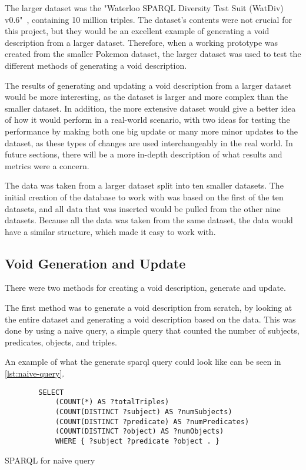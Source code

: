 The larger dataset was the "Waterloo SPARQL Diversity Test Suit (WatDiv) v0.6"~\cite{WatDiv}, containing 10 million triples. The dataset's contents were not crucial for this project, but they would be an excellent example of generating a \gls{void} description from a larger dataset. Therefore, when a working prototype was created from the smaller Pokemon dataset, the larger dataset was used to test the different methods of generating a \gls{void} description.

The results of generating and updating a \gls{void} description from a larger dataset would be more interesting, as the dataset is larger and more complex than the smaller dataset. In addition, the more extensive dataset would give a better idea of how it would perform in a real-world scenario, with two ideas for testing the performance by making both one big update or many more minor updates to the dataset, as these types of changes are used interchangeably in the real world. In future sections, there will be a more in-depth description of what results and metrics were a concern.

The data was taken from a larger dataset split into ten smaller datasets. The initial creation of the database to work with was based on the first of the ten datasets, and all data that was inserted would be pulled from the other nine datasets. Because all the data was taken from the same dataset, the data would have a similar structure, which made it easy to work with.

\subsection{Void Generation and Update}\label{sec:void}
There were two methods for creating a \gls{void} description, generate and update.

The first method was to generate a \gls{void} description from scratch, by looking at the entire dataset and generating a \gls{void} description based on the data. This was done by using a naive query, a simple query that counted the number of subjects, predicates, objects, and triples.

An example of what the generate \gls{sparql} query could look like can be seen in \autoref{lst:naive-query}.
\begin{listing}[!ht]
    \begin{verbatim}          
        SELECT
            (COUNT(*) AS ?totalTriples)
            (COUNT(DISTINCT ?subject) AS ?numSubjects)
            (COUNT(DISTINCT ?predicate) AS ?numPredicates)
            (COUNT(DISTINCT ?object) AS ?numObjects)
            WHERE { ?subject ?predicate ?object . }
    \end{verbatim}
    \caption{SPARQL for naive query}
    \label{lst:naive-query}
\end{listing}

